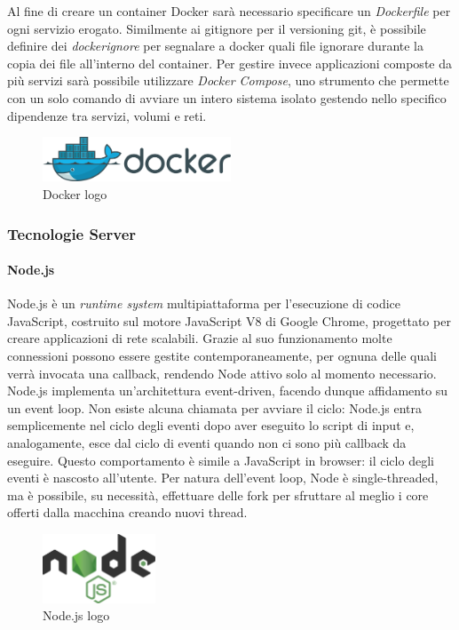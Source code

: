 Al fine di creare un container Docker sarà necessario specificare un \emph{Dockerfile} per ogni servizio erogato. 
Similmente ai gitignore per il versioning git, è possibile definire dei \emph{dockerignore} per segnalare a docker quali file ignorare durante la copia dei file all'interno del container. Per gestire invece applicazioni composte da più servizi sarà possibile utilizzare \emph{Docker Compose}, uno strumento che permette con un solo comando di avviare un intero sistema isolato gestendo nello specifico dipendenze tra servizi, volumi e reti.

\begin{figure}[H]
\centering
\includegraphics[width=0.5\textwidth]{img/logos/docker_logo.png}
\caption{Docker logo}
\label{fig:docker}
\end{figure}

\subsubsection{Tecnologie Server}
\paragraph{Node.js}
Node.js \cite{nodejsWikipedia} è un \emph{runtime system} multipiattaforma per l'esecuzione di codice JavaScript, costruito sul motore JavaScript V8 di Google Chrome, progettato per creare applicazioni di rete scalabili. Grazie al suo funzionamento molte connessioni possono essere gestite contemporaneamente, per ognuna delle quali verrà invocata una callback, rendendo Node attivo solo al momento necessario.\\[\baselineskip]\indent
Node.js implementa un'architettura event-driven, facendo dunque affidamento su un event loop. Non esiste alcuna chiamata per avviare il ciclo: Node.js entra semplicemente nel ciclo degli eventi dopo aver eseguito lo script di input e, analogamente, esce dal ciclo di eventi quando non ci sono più callback da eseguire. Questo comportamento è simile a JavaScript in browser: il ciclo degli eventi è nascosto all'utente.
Per natura dell'event loop, Node è single-threaded, ma è possibile, su necessità, effettuare delle fork per sfruttare al meglio i core offerti dalla macchina creando nuovi thread.

\begin{figure}[H]
\centering
\includegraphics[width=0.3\textwidth]{img/logos/nodejs_logo.png}
\caption{Node.js logo}
\label{fig:nodejs}
\end{figure}

